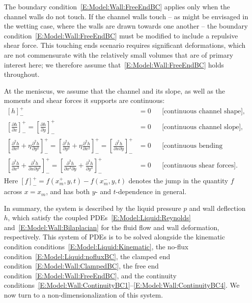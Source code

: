 \documentclass{jfm}
\newcommand{\ddp}[2]{\frac{\partial #1}{\partial #2}}
\newcommand{\poisson}{\eta} %
\newcommand{\x}{x}
\begin{document}
The boundary condition~\eqref{E:Model:Wall:FreeEndBC} applies only when the channel walls do not touch. If the channel walls touch -- as might be envisaged in the wetting case, where the walls are drawn towards one another -- the boundary condition~\eqref{E:Model:Wall:FreeEndBC} must be modified to include a repulsive shear force. This touching ends scenario requires significant deformations, which are not commensurate with the relatively small volumes that are of primary interest here; we therefore assume that~\eqref{E:Model:Wall:FreeEndBC} holds throughout. 

At the meniscus, we assume that the channel and its slope, as well as the moments and shear forces it supports are continuous:
\begin{align}
\left[ h \right]_{-}^{+}  &= 0 & &\text{[continuous channel shape]},\label{E:Model:Wall:ContinuityBC1}\\
\left[\ddp{h}{x} \right]_{-}^{+} = \left[\ddp{h}{y} \right]_{-}^{+} &=0 & &\text{[continuous channel slope],}  \\ 
\left[\ddp{^2 h}{x^2} + \poisson \ddp{^2 h}{y^2} \right]_{-}^{+} =   \left[\ddp{^2 h}{y^2} + \poisson \ddp{^2 h}{x^2}  \right]_{-}^{+} =  \left[\ddp{^2 h}{x \partial y} \right]_{-}^{+} &= 0 & &\text{[continuous bending moments],} \\
\left[\ddp{^3 h}{x^3} + \ddp{^3 h}{ x\partial y^2}\right]_{-}^{+} =  \left[\ddp{^3 h}{ x^2 \partial y} + \ddp{^3 h}{y^3} \right]_{-}^{+} &=0  & &\text{[continuous shear forces].}\label{E:Model:Wall:ContinuityBC4} 
\end{align}
Here $\left[ f \right]_-^+ = f(\x_m^+,y,t) - f(\x_m^-,y,t)$ denotes the jump in the quantity $f$ across $x = x_m$, and has both $y$- and $t$-dependence in general.

In summary, the system is described by the liquid pressure $p$ and wall deflection $h$, which satisfy the coupled PDEs~\eqref{E:Model:Liquid:Reynolds} and~\eqref{E:Model:Wall:Bilaplacian} for the fluid flow and wall deformation, respectively. This system of PDEs is to be solved alongside the kinematic condition conditions~\eqref{E:Model:Liquid:Kinematic}, the no-flux condition~\eqref{E:Model:Liquid:nofluxBC}, the clamped end condition~\eqref{E:Model:Wall:ClampedBC}, the free end condition~\eqref{E:Model:Wall:FreeEndBC}, and the continuity conditions~\eqref{E:Model:Wall:ContinuityBC1}--\eqref{E:Model:Wall:ContinuityBC4}. We now turn to a non-dimensionalization of this system.
\end{document}
